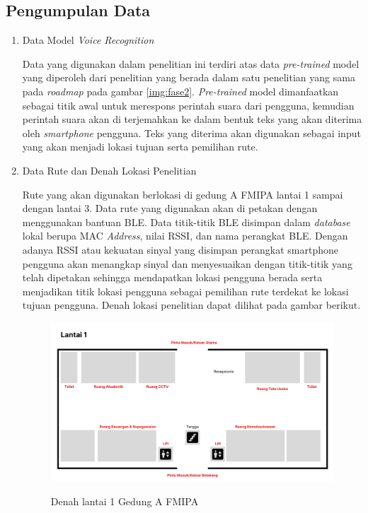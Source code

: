 \subsection{Pengumpulan Data}
\begin{enumerate}
\item Data Model \textit{Voice Recognition}
\par Data yang digunakan dalam penelitian ini terdiri atas data \textit{pre-trained} model yang diperoleh dari penelitian yang berada dalam satu penelitian yang sama pada \textit{roadmap} pada gambar \ref{img:fase2}. \textit{Pre-trained} model dimanfaatkan sebagai titik awal untuk merespons perintah suara dari pengguna, kemudian perintah suara akan di terjemahkan ke dalam bentuk teks yang akan diterima oleh \textit{smartphone} pengguna. Teks yang diterima akan digunakan sebagai input yang akan menjadi lokasi tujuan serta pemilihan rute.

\item Data Rute dan Denah Lokasi Penelitian
\par Rute yang akan digunakan berlokasi di gedung A FMIPA lantai 1 sampai dengan lantai 3. Data rute yang digunakan akan di petakan dengan menggunakan bantuan BLE. Data titik-titik BLE disimpan dalam \textit{database} lokal berupa MAC \textit{Address}, nilai RSSI, dan nama perangkat BLE. Dengan adanya RSSI atau kekuatan sinyal yang disimpan perangkat smartphone pengguna akan menangkap sinyal dan menyesuaikan dengan titik-titik yang telah dipetakan sehingga mendapatkan lokasi pengguna berada serta menjadikan titik lokasi pengguna sebagai pemilihan rute terdekat ke lokasi tujuan pengguna. Denah lokasi penelitian dapat dilihat pada gambar berikut.

\begin{figure}[H]
\centering
{\includegraphics [scale = 0.2]{gambar/bab3/Denah-1}}
\caption{Denah lantai 1 Gedung A FMIPA}
\label{img:denah_1}
\end{figure}


\end{enumerate}
